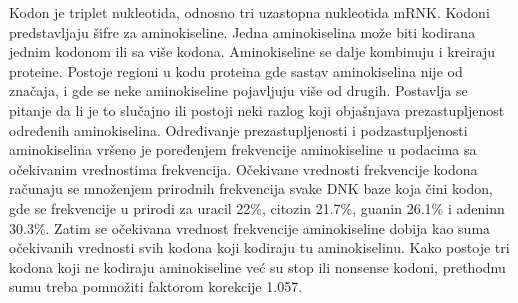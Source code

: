 \documentclass[a4paper,12pt]{article}
\begin{document}
Kodon je triplet nukleotida, odnosno tri uzastopna nukleotida mRNK. Kodoni predstavljaju šifre za aminokiseline. Jedna aminokiselina može biti kodirana jednim kodonom ili sa više kodona. Aminokiseline se dalje kombinuju i kreiraju proteine. Postoje regioni u kodu proteina gde sastav aminokiselina nije od značaja, i gde se neke aminokiseline pojavljuju više od drugih. Postavlja se pitanje da li je to slučajno ili postoji neki razlog koji objašnjava prezastupljenost određenih aminokiselina. 
Određivanje prezastupljenosti i podzastupljenosti aminokiselina vršeno je poređenjem frekvencije aminokiseline u podacima sa očekivanim vrednostima frekvencija. Očekivane vrednosti frekvencije  kodona računaju se množenjem prirodnih frekvencija svake DNK baze koja čini kodon, gde se frekvencije u prirodi za uracil 22\%, citozin 21.7\%, guanin 26.1\% i adeninn 30.3\%. Zatim se očekivana vrednost frekvencije aminokiseline dobija kao suma očekivanih vrednosti svih kodona koji kodiraju tu aminokiselinu. Kako postoje tri kodona koji ne kodiraju aminokiseline već su stop ili nonsense kodoni, prethodnu sumu treba pomnožiti faktorom korekcije 1.057. \cite{nimbios_aminoacid}
\end{document}
